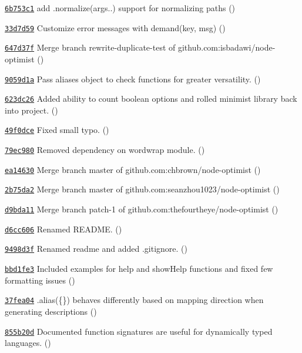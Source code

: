 \begin{DoxyItemize}
\item \href{https://github.com/bcoe/yargs/commit/6b753c16ca09e723060e70b773b430323b29c45c}{\tt 6b753c1} add .normalize(args..) support for normalizing paths ()
\item \href{https://github.com/bcoe/yargs/commit/33d7d59341d364f03d3a25f0a55cb99004dbbe4b}{\tt 33d7d59} Customize error messages with demand(key, msg) ()
\item \href{https://github.com/bcoe/yargs/commit/647d37f164c20f4bafbf67dd9db6cd6e2cd3b49f}{\tt 647d37f} Merge branch \textquotesingle{}rewrite-\/duplicate-\/test\textquotesingle{} of github.\+com\+:isbadawi/node-\/optimist ()
\item \href{https://github.com/bcoe/yargs/commit/9059d1ad5e8aea686c2a01c89a23efdf929fff2e}{\tt 9059d1a} Pass aliases object to check functions for greater versatility. ()
\item \href{https://github.com/bcoe/yargs/commit/623dc26c7331abff2465ef8532e3418996d42fe6}{\tt 623dc26} Added ability to count boolean options and rolled minimist library back into project. ()
\item \href{https://github.com/bcoe/yargs/commit/49f0dcef35de4db544c3966350d36eb5838703f6}{\tt 49f0dce} Fixed small typo. ()
\item \href{https://github.com/bcoe/yargs/commit/79ec9806d9ca6eb0014cfa4b6d1849f4f004baf2}{\tt 79ec980} Removed dependency on wordwrap module. ()
\item \href{https://github.com/bcoe/yargs/commit/ea14630feddd69d1de99dd8c0e08948f4c91f00a}{\tt ea14630} Merge branch \textquotesingle{}master\textquotesingle{} of github.\+com\+:chbrown/node-\/optimist ()
\item \href{https://github.com/bcoe/yargs/commit/2b75da2624061e0f4f3107d20303c06ec9054906}{\tt 2b75da2} Merge branch \textquotesingle{}master\textquotesingle{} of github.\+com\+:seanzhou1023/node-\/optimist ()
\item \href{https://github.com/bcoe/yargs/commit/d9bda1116e26f3b40e833ca9ca19263afea53565}{\tt d9bda11} Merge branch \textquotesingle{}patch-\/1\textquotesingle{} of github.\+com\+:thefourtheye/node-\/optimist ()
\item \href{https://github.com/bcoe/yargs/commit/d6cc6064a4f1bea38a16a4430b8a1334832fbeff}{\tt d6cc606} Renamed R\+E\+A\+D\+ME. ()
\item \href{https://github.com/bcoe/yargs/commit/9498d3f59acfb5e102826503e681623c3a64b178}{\tt 9498d3f} Renamed readme and added .gitignore. ()
\item \href{https://github.com/bcoe/yargs/commit/bbd1fe37fefa366dde0fb3dc44d91fe8b28f57f5}{\tt bbd1fe3} Included examples for {\ttfamily help} and {\ttfamily show\+Help} functions and fixed few formatting issues ()
\item \href{https://github.com/bcoe/yargs/commit/37fea0470a5796a0294c1dcfff68d8041650e622}{\tt 37fea04} .alias(\{\}) behaves differently based on mapping direction when generating descriptions ()
\item \href{https://github.com/bcoe/yargs/commit/855b20d0be567ca121d06b30bea64001b74f3d6d}{\tt 855b20d} Documented function signatures are useful for dynamically typed languages. ()
\end{DoxyItemize}

